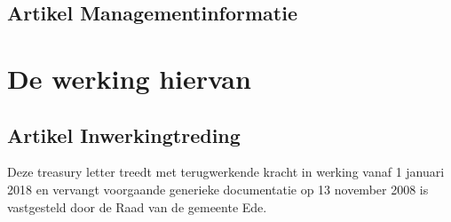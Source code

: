 \subsection*{Artikel \theartikel \hspace{1em} Managementinformatie}


\section*{De werking hiervan}
\subsection*{Artikel \theartikel \hspace{1em} Inwerkingtreding}
Deze treasury letter treedt met terugwerkende kracht in werking vanaf 1 januari 2018 en vervangt voorgaande generieke documentatie op 13 november 2008 is vastgesteld door de Raad van de gemeente Ede.

